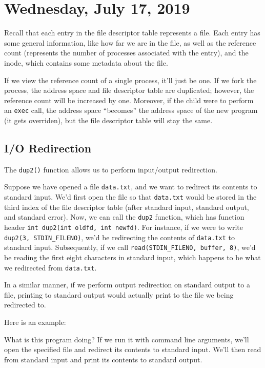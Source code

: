 \section{Wednesday, July 17, 2019}
Recall that each entry in the file descriptor table represents a file. Each entry has some general information, like how far we are in the file, as well as the reference count (represents the number of processes associated with the entry), and the inode, which contains some metadata about the file.

If we view the reference count of a single process, it'll just be one. If we fork the process, the address space and file descriptor table are duplicated; however, the reference count will be increased by one. Moreover, if the child were to perform an \verb!exec! call, the address space ``becomes'' the address space of the new program (it gets overriden), but the file descriptor table will stay the same.


\subsection{I/O Redirection}
The \verb!dup2()! function allows us to perform input/output redirection. 

Suppose we have opened a file \verb!data.txt!, and we want to redirect its contents to standard input. We'd first open the file so that \verb!data.txt! would be stored in the third index of the file descriptor table (after standard input, standard output, and standard error). Now, we can call the \verb!dup2! function, which has function header \verb!int dup2(int oldfd, int newfd)!. For instance, if we were to write \verb!dup2(3, STDIN_FILENO)!, we'd be redirecting the contents of \verb!data.txt! to standard input. Subsequently, if we call \verb!read(STDIN_FILENO, buffer, 8)!, we'd be reading the first eight characters in standard input, which happens to be what we redirected from \verb!data.txt!. 


In a similar manner, if we perform output redirection on standard output to a file, printing to standard output would actually print to the file we being redirected to.

Here is an example:


\lstset{caption=Dup2 Example 1}
\begin{center}

\end{center}

What is this program doing? If we run it with command line arguments, we'll open the specified file and redirect its contents to standard input. We'll then read from standard input and print its contents to standard output.

